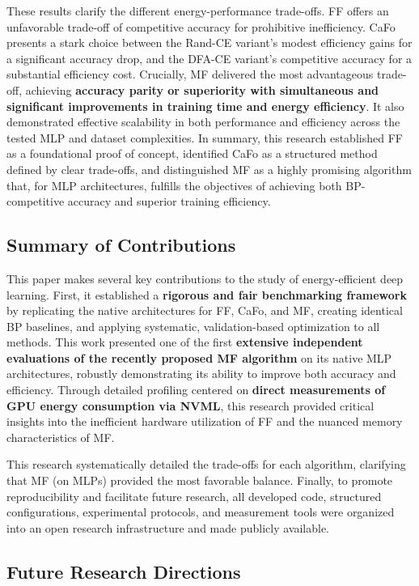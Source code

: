 These results clarify the different energy-performance trade-offs. FF offers an unfavorable trade-off of competitive accuracy for prohibitive inefficiency. CaFo presents a stark choice between the Rand-CE variant's modest efficiency gains for a significant accuracy drop, and the DFA-CE variant's competitive accuracy for a substantial efficiency cost. Crucially, MF delivered the most advantageous trade-off, achieving \textbf{accuracy parity or superiority with simultaneous and significant improvements in training time and energy efficiency}. It also demonstrated effective scalability in both performance and efficiency across the tested MLP and dataset complexities. In summary, this research established FF as a foundational proof of concept, identified CaFo as a structured method defined by clear trade-offs, and distinguished MF as a highly promising algorithm that, for MLP architectures, fulfills the objectives of achieving both BP-competitive accuracy and superior training efficiency.

\subsection{Summary of Contributions}
\label{sec:conclusion_contributions}

This paper makes several key contributions to the study of energy-efficient deep learning. First, it established a \textbf{rigorous and fair benchmarking framework} by replicating the native architectures for FF, CaFo, and MF, creating identical BP baselines, and applying systematic, validation-based optimization to all methods. This work presented one of the first \textbf{extensive independent evaluations of the recently proposed MF algorithm} on its native MLP architectures, robustly demonstrating its ability to improve both accuracy and efficiency. Through detailed profiling centered on \textbf{direct measurements of GPU energy consumption via NVML}, this research provided critical insights into the inefficient hardware utilization of FF and the nuanced memory characteristics of MF.
\pagebreak

This research systematically detailed the trade-offs for each algorithm, clarifying that MF (on MLPs) provided the most favorable balance. Finally, to promote reproducibility and facilitate future research, all developed code, structured configurations, experimental protocols, and measurement tools were organized into an open research infrastructure and made publicly available.

\subsection{Future Research Directions}
\label{sec:conclusion_future_work}

